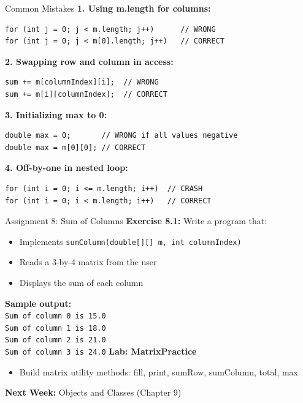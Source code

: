 \documentclass{beamer}
\begin{document}
\begin{frame}[fragile]{Common Mistakes}
\textbf{1. Using m.length for columns:}
\begin{lstlisting}
for (int j = 0; j < m.length; j++)      // WRONG
for (int j = 0; j < m[0].length; j++)   // CORRECT
\end{lstlisting}
\vspace{0.2cm}
\textbf{2. Swapping row and column in access:}
\begin{lstlisting}
sum += m[columnIndex][i];  // WRONG
sum += m[i][columnIndex];  // CORRECT
\end{lstlisting}
\vspace{0.2cm}
\textbf{3. Initializing max to 0:}
\begin{lstlisting}
double max = 0;       // WRONG if all values negative
double max = m[0][0]; // CORRECT
\end{lstlisting}
\vspace{0.2cm}
\textbf{4. Off-by-one in nested loop:}
\begin{lstlisting}
for (int i = 0; i <= m.length; i++)  // CRASH
for (int i = 0; i < m.length; i++)   // CORRECT
\end{lstlisting}
\end{frame}
\begin{frame}{Assignment 8: Sum of Columns}
\textbf{Exercise 8.1:} Write a program that:
\begin{itemize}
  \item Implements \texttt{sumColumn(double[][] m, int columnIndex)}
  \item Reads a 3-by-4 matrix from the user
  \item Displays the sum of each column
\end{itemize}
\vspace{0.4cm}
\textbf{Sample output:}\\
\texttt{Sum of column 0 is 15.0}\\
\texttt{Sum of column 1 is 18.0}\\
\texttt{Sum of column 2 is 21.0}\\
\texttt{Sum of column 3 is 24.0}
\vspace{0.4cm}
\textbf{Lab: MatrixPractice}
\begin{itemize}
  \item Build matrix utility methods: fill, print, sumRow, sumColumn, total, max
\end{itemize}
\vspace{0.3cm}
\textbf{Next Week:} Objects and Classes (Chapter 9)
\end{frame}
\end{document}
